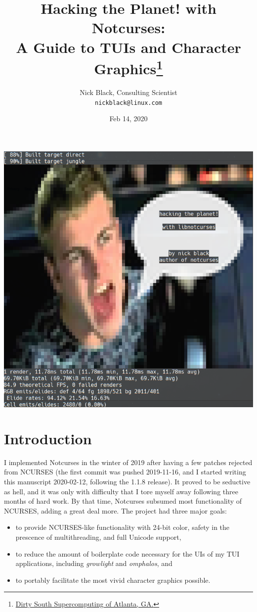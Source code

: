 \documentclass[letterpaper,10pt]{article}
\title{Hacking the Planet! with Notcurses:\\
A Guide to TUIs and Character Graphics\thanks{
 \href{https://www.dsscaw.com/}{Dirty South Supercomputing of Atlanta, GA.}
}\\
}
\author{Nick Black, Consulting Scientist\\
\texttt{nickblack@linux.com}
}
\newenvironment{denseitemize}{
  \begin{itemize}
      \setlength{\itemsep}{0pt}
}{
  \end{itemize}
}
\begin{document}
\date{Feb 14, 2020}
\maketitle
\thispagestyle{fancy}
\date{}
\vspace{1in}
\begin{center}
\includegraphics[width=.75\linewidth]{htp-with-notcurses.png}
\end{center}

\clearpage

\tableofcontents

\section{Introduction}

I implemented Notcurses in the winter of 2019 after having a few patches
rejected from NCURSES (the first commit was pushed 2019-11-16, and I started
writing this manuscript 2020-02-12, following the 1.1.8 release). It proved to
be seductive as hell, and it was only with difficulty that I tore myself away
following three months of hard work. By that time, Notcurses subsumed most
functionality of NCURSES, adding a great deal more. The project had three
major goals:

\begin{denseitemize}
\item  to provide NCURSES-like functionality with 24-bit color, safety in the
    prescence of multithreading, and full Unicode support,
\item to reduce the amount of boilerplate code necessary for the UIs of my
    TUI applications, including \textit{growlight} and \textit{omphalos}, and
\item to portably facilitate the most vivid character graphics possible.
\end{denseitemize}
\end{document}
